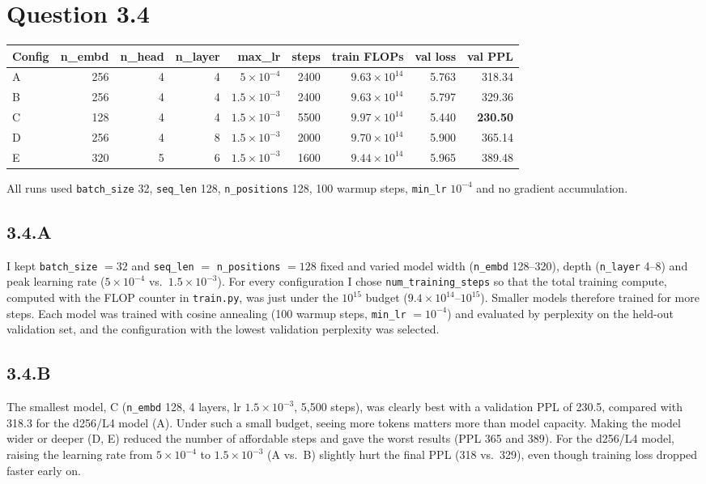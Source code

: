 \documentclass{article}
\begin{document}
\section*{Question 3.4}

\begin{center}
\begin{tabular}{lrrrrrrrr}
\toprule
Config & n\_embd & n\_head & n\_layer & max\_lr & steps & train FLOPs & val loss & val PPL \\
\midrule
A & 256 & 4 & 4 & $5\times10^{-4}$   & 2400 & $9.63\times10^{14}$ & 5.763 & 318.34 \\
B & 256 & 4 & 4 & $1.5\times10^{-3}$ & 2400 & $9.63\times10^{14}$ & 5.797 & 329.36 \\
C & 128 & 4 & 4 & $1.5\times10^{-3}$ & 5500 & $9.97\times10^{14}$ & 5.440 & \textbf{230.50} \\
D & 256 & 4 & 8 & $1.5\times10^{-3}$ & 2000 & $9.70\times10^{14}$ & 5.900 & 365.14 \\
E & 320 & 5 & 6 & $1.5\times10^{-3}$ & 1600 & $9.44\times10^{14}$ & 5.965 & 389.48 \\
\bottomrule
\end{tabular}
\end{center}
All runs used \texttt{batch\_size} 32, \texttt{seq\_len} 128, \texttt{n\_positions} 128, 100 warmup steps, \texttt{min\_lr} $10^{-4}$ and no gradient accumulation.

\subsection*{3.4.A}
I kept \texttt{batch\_size} $= 32$ and \texttt{seq\_len} $=$ \texttt{n\_positions} $= 128$ fixed and varied model width (\texttt{n\_embd} 128--320), depth (\texttt{n\_layer} 4--8) and peak learning rate ($5\times10^{-4}$ vs.\ $1.5\times10^{-3}$). For every configuration I chose \texttt{num\_training\_steps} so that the total training compute, computed with the FLOP counter in \texttt{train.py}, was just under the $10^{15}$ budget ($9.4\times10^{14}$--$10^{15}$). Smaller models therefore trained for more steps. Each model was trained with cosine annealing (100 warmup steps, \texttt{min\_lr} $= 10^{-4}$) and evaluated by perplexity on the held-out validation set, and the configuration with the lowest validation perplexity was selected.

\subsection*{3.4.B}
The smallest model, C (\texttt{n\_embd} 128, 4 layers, lr $1.5\times10^{-3}$, 5,500 steps), was clearly best with a validation PPL of 230.5, compared with 318.3 for the d256/L4 model (A). Under such a small budget, seeing more tokens matters more than model capacity. Making the model wider or deeper (D, E) reduced the number of affordable steps and gave the worst results (PPL 365 and 389). For the d256/L4 model, raising the learning rate from $5\times10^{-4}$ to $1.5\times10^{-3}$ (A vs.\ B) slightly hurt the final PPL (318 vs.\ 329), even though training loss dropped faster early on.
\end{document}
